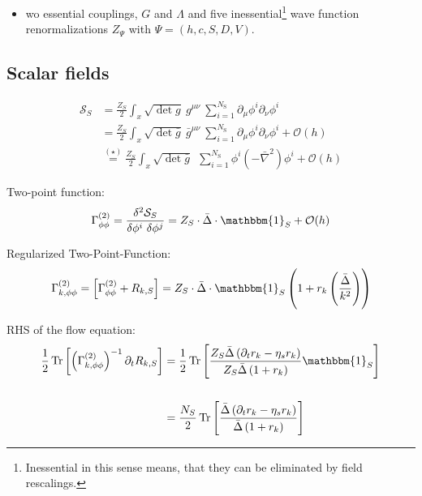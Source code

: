 \begin{itemize}
	\item wo essential couplings, $G$ and $\Lambda$ and five inessential\footnote{Inessential in this sense means, that they can be eliminated by field rescalings.} wave function renormalizations $Z_{\Psi}$ with $\Psi = (h,c,S,D,V)$.
\end{itemize}
\subsection{Scalar fields}
\begin{align}
	\mathcal{S}_S &= \frac{Z_{S}}{2}\int_x \sqrt{\operatorname{det}g} \ g^{\mu\nu} \ \sum\limits_{i=1}^{N_{\text{S}}} \partial_{\mu}\phi^{i}\partial_{\nu}\phi^{i} \nonumber \\
&=  \frac{Z_{S}}{2}\int_x \sqrt{\operatorname{det}\bar{g}} \ \bar{g}^{\mu\nu} \ \sum\limits_{i=1}^{N_{\text{S}}} \partial_{\mu}\phi^{i}\partial_{\nu}\phi^{i} + \mathcal{O}(h) \\
&\overset{(\star)}{=} \frac{Z_{S}}{2}\int_x \sqrt{\operatorname{det}\bar{g}} \ \ \sum\limits_{i=1}^{N_{\text{S}}} \phi^{i}\left(-\bar{\nabla}^2\right)\phi^{i} + \mathcal{O}(h) \nonumber
\end{align}

Two-point function:
\begin{align}
	\Gamma^{(2)}_{\phi\phi} = \frac{\delta^2 \mathcal{S}_S}{\delta\phi^{i}\ \delta\phi^{j}} = Z_S \cdot\bar{\Delta}\cdot\mathbbm{1}_S + \mathcal{O}(h)  
\end{align}

Regularized Two-Point-Function:
\begin{align}
	\Gamma^{(2)}_{k, \phi\phi} = \left[\Gamma^{(2)}_{\phi\phi}+ R_{k, S}\right]  = Z_S \cdot\bar{\Delta}\cdot\mathbbm{1}_S\left(1 + r_k\left(\frac{\bar{\Delta}}{k^2}\right)\right) 
\end{align}



RHS of the flow equation:
\begin{align}
	\frac{1}{2}\tr{\left(\Gamma^{(2)}_{k, \phi\phi}\right)^{-1}\partial_t R_{k,S}} &= \frac{1}{2}\tr{\frac{Z_S\bar{\Delta}\left(\partial_t r_k - \eta_s r_k\right)}{Z_S \bar{\Delta}\left(1 + r_k\right)}\mathbbm{1}_S} \nonumber\\
	\phantom{.} \\
	&=   \frac{N_S}{2}\tr{\frac{\bar{\Delta}\left(\partial_t r_k - \eta_s r_k\right)}{\bar{\Delta}\left(1 + r_k\right)}} \nonumber
\end{align}

